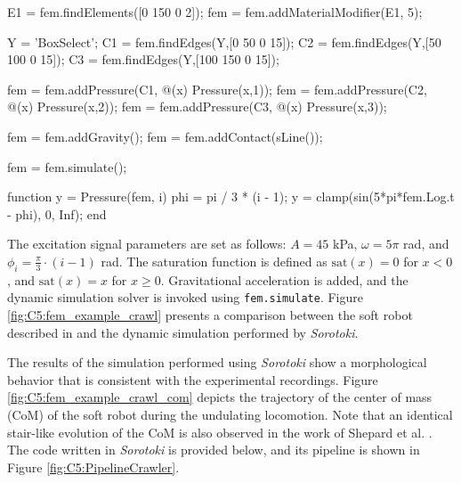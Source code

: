 \begin{example}
\begin{matlabcode}
E1  = fem.findElements([0 150 0 2]);
fem = fem.addMaterialModifier(E1, 5);

Y  = 'BoxSelect';
C1 = fem.findEdges(Y,[0   50 0 15]);
C2 = fem.findEdges(Y,[50  100 0 15]);
C3 = fem.findEdges(Y,[100 150 0 15]);

fem = fem.addPressure(C1, @(x) Pressure(x,1));
fem = fem.addPressure(C2, @(x) Pressure(x,2));
fem = fem.addPressure(C3, @(x) Pressure(x,3));

fem = fem.addGravity();
fem = fem.addContact(sLine());

fem = fem.simulate();

function y = Pressure(fem, i)
    phi = pi / 3 * (i - 1);
    y = clamp(sin(5*pi*fem.Log.t - phi), 0, Inf);
end
\end{matlabcode}

The excitation signal parameters are set as follows: $A = 45$ \si{\kilo \pascal}, $\omega = 5 \pi$ \si{\radian}, and $\phi_i = \frac{\pi}{3} \cdot (i-1)$ \si{\radian}. The saturation function is defined as $\textrm{sat}(x) = 0$ for $x < 0$, and $\textrm{sat}(x) = x$ for $x \geq 0$. Gravitational acceleration is added, and the dynamic simulation solver is invoked using \texttt{fem.simulate}. Figure \ref{fig:C5:fem_example_crawl} presents a comparison between the soft robot described in \cite{Shepherd2011Dec} and the dynamic simulation performed by \textit{Sorotoki}.

The results of the simulation performed using \textit{Sorotoki} show a morphological behavior that is consistent with the experimental recordings. Figure \ref{fig:C5:fem_example_crawl_com} depicts the trajectory of the center of mass (CoM) of the soft robot during the undulating locomotion. Note that an identical stair-like evolution of the CoM is also observed in the work of Shepard et al. \cite{Shepherd2011Dec}. The code written in \textit{Sorotoki} is provided below, and its pipeline is shown in Figure \ref{fig:C5:PipelineCrawler}. 
\vfill
\end{example}

%

